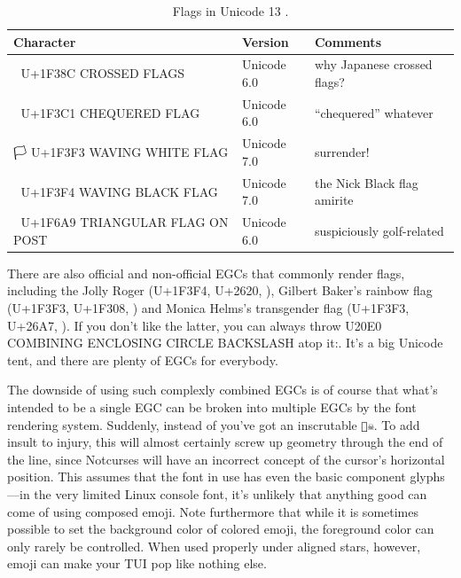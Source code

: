 \begin{table}[!htb]
  \centering
  \begin{tabular}{|l|l|l|}
  \hline
  Character & Version & Comments \\
  \hline
  \hline
  🎌 U+1F38C CROSSED FLAGS & Unicode 6.0 & why Japanese crossed flags? \\
  \hline
  🏁 U+1F3C1 CHEQUERED FLAG & Unicode 6.0 & ``chequered'' whatever \\
  \hline
  🏳 U+1F3F3 WAVING WHITE FLAG & Unicode 7.0 & surrender! \\
  \hline
  🏴  U+1F3F4 WAVING BLACK FLAG & Unicode 7.0 & the Nick Black flag amirite \\
  \hline
  🚩 U+1F6A9 TRIANGULAR FLAG ON POST & Unicode 6.0 & suspiciously golf-related \\
  \hline
  \end{tabular}
  \caption{Flags in Unicode 13 .}
  \label{table:flags}
\end{table}

There are also official and non-official EGCs that commonly render flags, including
the Jolly Roger (U+1F3F4, U+2620, ),
Gilbert Baker's rainbow flag (U+1F3F3, U+1F308, ) and Monica Helms's
transgender flag (U+1F3F3, U+26A7, ).
If you don't like the latter, you can always throw U20E0 COMBINING ENCLOSING
CIRCLE BACKSLASH atop it:. It's a big Unicode tent, and there are plenty
of EGCs for everybody.

The downside of using such complexly combined EGCs is of course that what's
intended to be a single EGC can be broken into multiple EGCs by the font
rendering system. Suddenly, instead of 
you've got an inscrutable \texttt{🏴☠}. To add insult to injury, this will
almost certainly screw up geometry through the end of the line, since Notcurses
will have an incorrect concept of the cursor's horizontal position. This
assumes that the font in use has even the basic component glyphs---in the very
limited Linux console font, it's unlikely that anything good can come of using
composed emoji. Note furthermore that while it is sometimes possible to set the
background color of colored emoji, the foreground color can only rarely be
controlled. When used properly under aligned stars, however, emoji can make
your TUI pop like nothing else.

